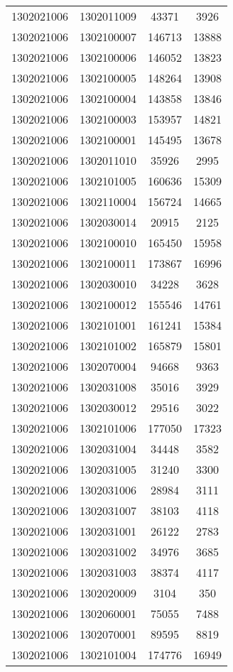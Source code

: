 \begin{longtable}{llcc}
1302021006 & 1302011009 & 43371 & 3926\\
1302021006 & 1302100007 & 146713 & 13888\\
1302021006 & 1302100006 & 146052 & 13823\\
1302021006 & 1302100005 & 148264 & 13908\\
1302021006 & 1302100004 & 143858 & 13846\\
1302021006 & 1302100003 & 153957 & 14821\\
1302021006 & 1302100001 & 145495 & 13678\\
1302021006 & 1302011010 & 35926 & 2995\\
1302021006 & 1302101005 & 160636 & 15309\\
1302021006 & 1302110004 & 156724 & 14665\\
1302021006 & 1302030014 & 20915 & 2125\\
1302021006 & 1302100010 & 165450 & 15958\\
1302021006 & 1302100011 & 173867 & 16996\\
1302021006 & 1302030010 & 34228 & 3628\\
1302021006 & 1302100012 & 155546 & 14761\\
1302021006 & 1302101001 & 161241 & 15384\\
1302021006 & 1302101002 & 165879 & 15801\\
1302021006 & 1302070004 & 94668 & 9363\\
1302021006 & 1302031008 & 35016 & 3929\\
1302021006 & 1302030012 & 29516 & 3022\\
1302021006 & 1302101006 & 177050 & 17323\\
1302021006 & 1302031004 & 34448 & 3582\\
1302021006 & 1302031005 & 31240 & 3300\\
1302021006 & 1302031006 & 28984 & 3111\\
1302021006 & 1302031007 & 38103 & 4118\\
1302021006 & 1302031001 & 26122 & 2783\\
1302021006 & 1302031002 & 34976 & 3685\\
1302021006 & 1302031003 & 38374 & 4117\\
1302021006 & 1302020009 & 3104 & 350\\
1302021006 & 1302060001 & 75055 & 7488\\
1302021006 & 1302070001 & 89595 & 8819\\
1302021006 & 1302101004 & 174776 & 16949\\

\end{longtable}
